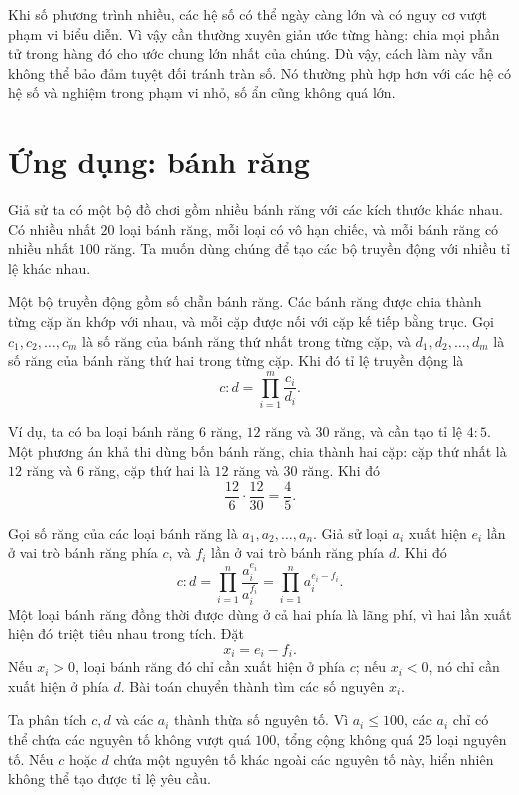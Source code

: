 \documentclass[11pt]{article}
\begin{document}
Khi số phương trình nhiều, các hệ số có thể ngày càng lớn và có nguy cơ vượt
phạm vi biểu diễn. Vì vậy cần thường xuyên giản ước từng hàng: chia mọi phần
tử trong hàng đó cho ước chung lớn nhất của chúng. Dù vậy, cách làm này vẫn
không thể bảo đảm tuyệt đối tránh tràn số. Nó thường phù hợp hơn với các hệ
có hệ số và nghiệm trong phạm vi nhỏ, số ẩn cũng không quá lớn.

\section{Ứng dụng: bánh răng}

Giả sử ta có một bộ đồ chơi gồm nhiều bánh răng với các kích thước khác nhau.
Có nhiều nhất \(20\) loại bánh răng, mỗi loại có vô hạn chiếc, và mỗi bánh
răng có nhiều nhất \(100\) răng. Ta muốn dùng chúng để tạo các bộ truyền động
với nhiều tỉ lệ khác nhau.

Một bộ truyền động gồm số chẵn bánh răng. Các bánh răng được chia thành từng
cặp ăn khớp với nhau, và mỗi cặp được nối với cặp kế tiếp bằng trục. Gọi
\(c_1,c_2,\ldots,c_m\) là số răng của bánh răng thứ nhất trong từng cặp, và
\(d_1,d_2,\ldots,d_m\) là số răng của bánh răng thứ hai trong từng cặp. Khi
đó tỉ lệ truyền động là
\[
  c:d=\prod_{i=1}^{m}\frac{c_i}{d_i}.
\]

Ví dụ, ta có ba loại bánh răng \(6\) răng, \(12\) răng và \(30\) răng, và cần
tạo tỉ lệ \(4:5\). Một phương án khả thi dùng bốn bánh răng, chia thành hai
cặp: cặp thứ nhất là \(12\) răng và \(6\) răng, cặp thứ hai là \(12\) răng và
\(30\) răng. Khi đó
\[
  \frac{12}{6}\cdot\frac{12}{30}=\frac{4}{5}.
\]

Gọi số răng của các loại bánh răng là \(a_1,a_2,\ldots,a_n\). Giả sử loại
\(a_i\) xuất hiện \(e_i\) lần ở vai trò bánh răng phía \(c\), và \(f_i\) lần
ở vai trò bánh răng phía \(d\). Khi đó
\[
  c:d
  =
  \prod_{i=1}^{n}\frac{a_i^{e_i}}{a_i^{f_i}}
  =
  \prod_{i=1}^{n}a_i^{e_i-f_i}.
\]
Một loại bánh răng đồng thời được dùng ở cả hai phía là lãng phí, vì hai lần
xuất hiện đó triệt tiêu nhau trong tích. Đặt
\[
  x_i=e_i-f_i.
\]
Nếu \(x_i>0\), loại bánh răng đó chỉ cần xuất hiện ở phía \(c\); nếu
\(x_i<0\), nó chỉ cần xuất hiện ở phía \(d\). Bài toán chuyển thành tìm các
số nguyên \(x_i\).

Ta phân tích \(c,d\) và các \(a_i\) thành thừa số nguyên tố. Vì \(a_i\le 100\),
các \(a_i\) chỉ có thể chứa các nguyên tố không vượt quá \(100\), tổng cộng
không quá \(25\) loại nguyên tố. Nếu \(c\) hoặc \(d\) chứa một nguyên tố khác
ngoài các nguyên tố này, hiển nhiên không thể tạo được tỉ lệ yêu cầu.
\end{document}
